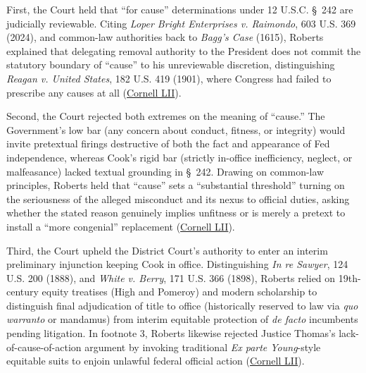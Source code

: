 \documentclass[12pt]{article}
\begin{document}
First, the Court held that ``for cause'' determinations under 12 U.S.C. \S~242 are judicially reviewable. Citing \textit{Loper Bright Enterprises v. Raimondo}, 603 U.S. 369 (2024), and common-law authorities back to \textit{Bagg's Case} (1615), Roberts explained that delegating removal authority to the President does not commit the statutory boundary of ``cause'' to his unreviewable discretion, distinguishing \textit{Reagan v. United States}, 182 U.S. 419 (1901), where Congress had failed to prescribe any causes at all (\href{https://www.law.cornell.edu/supremecourt/text/25A312}{Cornell LII}).

Second, the Court rejected both extremes on the meaning of ``cause.'' The Government's low bar (any concern about conduct, fitness, or integrity) would invite pretextual firings destructive of both the fact and appearance of Fed independence, whereas Cook's rigid bar (strictly in-office inefficiency, neglect, or malfeasance) lacked textual grounding in \S~242. Drawing on common-law principles, Roberts held that ``cause'' sets a ``substantial threshold'' turning on the seriousness of the alleged misconduct and its nexus to official duties, asking whether the stated reason genuinely implies unfitness or is merely a pretext to install a ``more congenial'' replacement (\href{https://www.law.cornell.edu/supremecourt/text/25A312}{Cornell LII}).

Third, the Court upheld the District Court's authority to enter an interim preliminary injunction keeping Cook in office. Distinguishing \textit{In re Sawyer}, 124 U.S. 200 (1888), and \textit{White v. Berry}, 171 U.S. 366 (1898), Roberts relied on 19th-century equity treatises (High and Pomeroy) and modern scholarship to distinguish final adjudication of title to office (historically reserved to law via \textit{quo warranto} or mandamus) from interim equitable protection of \textit{de facto} incumbents pending litigation. In footnote 3, Roberts likewise rejected Justice Thomas's lack-of-cause-of-action argument by invoking traditional \textit{Ex parte Young}-style equitable suits to enjoin unlawful federal official action (\href{https://www.law.cornell.edu/supremecourt/text/25A312}{Cornell LII}).
\end{document}
